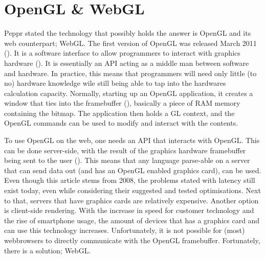 \section{OpenGL \& WebGL}
Peppr stated the technology that possibly holds the answer is OpenGL and its web counterpart; WebGL.
The first version of OpenGL was released March 2011 (\cite{openGLsite}). It is a software interface to allow programmers to interact with graphics hardware (\cite{openGLSpecification}). It is essentially an API acting as a middle man between software and hardware. In practice, this means that programmers will need only little (to no) hardware knowledge wile still being able to tap into the hardwares calculation capacity. Normally, starting up an OpenGL application, it creates a window that ties into the framebuffer (\cite{framebuffer}), basically a piece of RAM memory containing the bitmap. The application then holds a GL context, and the OpenGL commands can be used to modify and interact with the contents.

To use OpenGL on the web, one needs an API that interacts with OpenGL. This can be done server-side, with the result of the graphics hardware framebuffer being sent to the user (\cite{CRRS}). This means that any language parse-able on a server that can send data out (and has an OpenGL enabled graphics card), can be used. Even though this article stems from 2008, the problems stated with latency still exist today, even while considering their suggested and tested optimisations. Next to that, servers that have graphics cards are relatively expensive. Another option is client-side rendering. With the increase in speed for customer technology and the rise of smartphone usage, the amount of devices that has a graphics card and can use this technology increases. Unfortunately, it is not possible for (most) webbrowsers to directly communicate with the OpenGL framebuffer. Fortunately, there is a solution; WebGL.

\cite{webGL}

